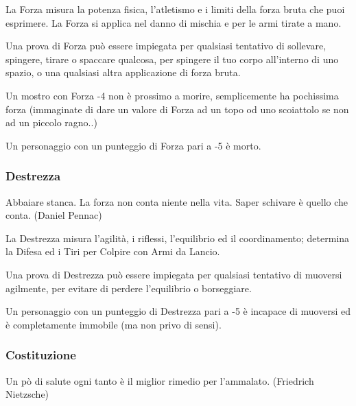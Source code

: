 \begin{multicols}{2}
La Forza misura la potenza fisica, l'atletismo e i limiti della forza bruta che puoi esprimere. La Forza si applica nel danno di mischia e per le armi tirate a mano.

Una prova di Forza può essere impiegata per qualsiasi tentativo di sollevare, spingere, tirare o spaccare qualcosa, per spingere il tuo corpo all'interno di uno spazio, o una qualsiasi altra applicazione di forza bruta.

Un mostro con Forza -4 non è prossimo a morire, semplicemente ha pochissima forza (immaginate di dare un valore di Forza ad un topo od uno scoiattolo se non ad un piccolo ragno..)

Un personaggio con un punteggio di Forza pari a -5 è morto.


\subsubsection{Destrezza}\label{destrezza}

\begin{changemargin}{0.3cm}{0.3cm}\begin{enfasi}{
Abbaiare stanca. La forza non conta niente nella vita. Saper schivare è quello che conta. (Daniel Pennac)
}\end{enfasi}\end{changemargin}

La Destrezza misura l'agilità, i riflessi, l'equilibrio ed il coordinamento; determina la Difesa ed i Tiri per Colpire con Armi da Lancio.

Una prova di Destrezza può essere impiegata per qualsiasi tentativo di muoversi agilmente, per evitare di perdere l'equilibrio o borseggiare.

Un personaggio con un punteggio di Destrezza pari a -5 è incapace di muoversi ed è completamente immobile (ma non privo di sensi).

\subsubsection{Costituzione}\label{costituzione}

\begin{changemargin}{0.3cm}{0.3cm}\begin{enfasi}{
Un pò di salute ogni tanto è il miglior rimedio per l'ammalato. (Friedrich Nietzsche)
}\end{enfasi}\end{changemargin}


\end{multicols}
